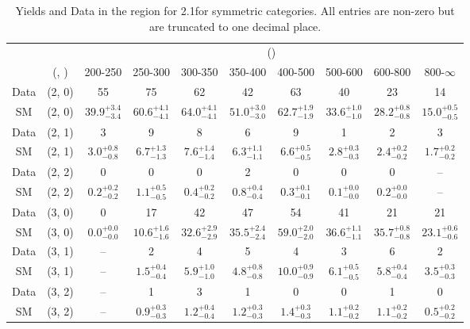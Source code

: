 \begin{table}[h!]
\tiny
\centering
\caption{Yields and Data in the \mmj region for 2.1\ifb for symmetric categories. All entries are non-zero but are truncated to one decimal place.\label{tab:yieldsallqcd_mumu_comb_sym}}
\begin{tabular}
{cccccccccc}
	\hline\hline
	&	& \multicolumn{8}{c}{\scalht (\gev)}\\ 
	&	 (\njet, \nb) & 200-250 & 250-300 & 300-350 & 350-400 & 400-500 & 500-600 & 600-800 & 800-$\infty$ \\ [0.8ex] 
\hline
	Data & (2, 0) & 55 & 75 & 62 & 42 & 63 & 40 & 23 & 14 \\[0.5ex] 
	SM & (2, 0) & $39.9^{+ 3.4 }_{- 3.4 }$ & $60.6^{+ 4.1 }_{- 4.1 }$ & $64.0^{+ 4.1 }_{- 4.1 }$ & $51.0^{+ 3.0 }_{- 3.0 }$ & $62.7^{+ 1.9 }_{- 1.9 }$ & $33.6^{+ 1.0 }_{- 1.0 }$ & $28.2^{+ 0.8 }_{- 0.8 }$ & $15.0^{+ 0.5 }_{- 0.5 }$ \\[0.5ex] 
	Data & (2, 1) & 3 & 9 & 8 & 6 & 9 & 1 & 2 & 3 \\[0.5ex] 
	SM & (2, 1) & $3.0^{+ 0.8 }_{- 0.8 }$ & $6.7^{+ 1.3 }_{- 1.3 }$ & $7.6^{+ 1.4 }_{- 1.4 }$ & $6.3^{+ 1.1 }_{- 1.1 }$ & $6.6^{+ 0.5 }_{- 0.5 }$ & $2.8^{+ 0.3 }_{- 0.3 }$ & $2.4^{+ 0.2 }_{- 0.2 }$ & $1.7^{+ 0.2 }_{- 0.2 }$ \\[0.5ex] 
	Data & (2, 2) & 0 & 0 & 0 & 2 & 0 & 0 & 0 & -- \\[0.5ex] 
	SM & (2, 2) & $0.2^{+ 0.2 }_{- 0.2 }$ & $1.1^{+ 0.5 }_{- 0.5 }$ & $0.4^{+ 0.2 }_{- 0.2 }$ & $0.8^{+ 0.4 }_{- 0.4 }$ & $0.3^{+ 0.1 }_{- 0.1 }$ & $0.1^{+ 0.0 }_{- 0.0 }$ & $0.2^{+ 0.0 }_{- 0.0 }$ & -- \\[0.5ex] 
	Data & (3, 0) & 0 & 17 & 42 & 47 & 54 & 41 & 21 & 21 \\[0.5ex] 
	SM & (3, 0) & $0.0^{+ 0.0 }_{- 0.0 }$ & $10.6^{+ 1.6 }_{- 1.6 }$ & $32.6^{+ 2.9 }_{- 2.9 }$ & $35.5^{+ 2.4 }_{- 2.4 }$ & $59.0^{+ 2.0 }_{- 2.0 }$ & $36.6^{+ 1.1 }_{- 1.1 }$ & $35.7^{+ 0.8 }_{- 0.8 }$ & $23.1^{+ 0.6 }_{- 0.6 }$ \\[0.5ex] 
	Data & (3, 1) & -- & 2 & 4 & 5 & 4 & 3 & 6 & 2 \\[0.5ex] 
	SM & (3, 1) & -- & $1.5^{+ 0.4 }_{- 0.4 }$ & $5.9^{+ 1.0 }_{- 1.0 }$ & $4.8^{+ 0.8 }_{- 0.8 }$ & $10.0^{+ 0.9 }_{- 0.9 }$ & $6.1^{+ 0.5 }_{- 0.5 }$ & $5.8^{+ 0.4 }_{- 0.4 }$ & $3.5^{+ 0.3 }_{- 0.3 }$ \\[0.5ex] 
	Data & (3, 2) & -- & 1 & 3 & 1 & 0 & 0 & 1 & 0 \\[0.5ex] 
	SM & (3, 2) & -- & $0.9^{+ 0.3 }_{- 0.3 }$ & $1.2^{+ 0.4 }_{- 0.4 }$ & $1.2^{+ 0.3 }_{- 0.3 }$ & $1.4^{+ 0.3 }_{- 0.3 }$ & $1.1^{+ 0.2 }_{- 0.2 }$ & $1.1^{+ 0.2 }_{- 0.2 }$ & $0.5^{+ 0.2 }_{- 0.2 }$ \\[0.5ex] 

\end{tabular}
\end{table}
